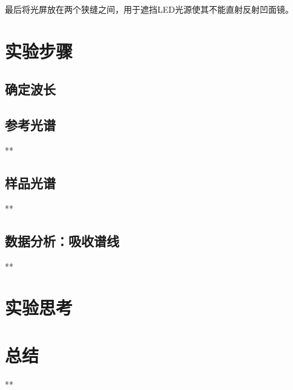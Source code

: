 \documentclass{ctexart}
\begin{document}
最后将光屏放在两个狭缝之间，用于遮挡LED光源使其不能直射反射凹面镜。

\section{实验步骤}
\subsection{确定波长}

\subsection{参考光谱}
**

\subsection{样品光谱}
**

\subsection{数据分析：吸收谱线}
**

\section{实验思考}

\section{总结}
**
\end{document}
